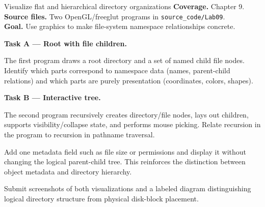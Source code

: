 \begin{labproject}{Visualize flat and hierarchical directory organizations}
\textbf{Coverage.} Chapter 9.\\
\textbf{Source files.} Two OpenGL/freeglut programs in \texttt{source\_code/Lab09}.\\
\textbf{Goal.} Use graphics to make file-system namespace relationships concrete.

\medskip\noindent\textbf{Task A --- Root with file children.}\par
The first program draws a root directory and a set of named child file nodes. Identify which parts correspond to namespace data (names, parent-child relations) and which parts are purely presentation (coordinates, colors, shapes).

\medskip\noindent\textbf{Task B --- Interactive tree.}\par
The second program recursively creates directory/file nodes, lays out children, supports visibility/collapse state, and performs mouse picking. Relate recursion in the program to recursion in pathname traversal.

\begin{tryit}
Add one metadata field such as file size or permissions and display it without changing the logical parent-child tree. This reinforces the distinction between object metadata and directory hierarchy.
\end{tryit}
\end{labproject}

\begin{labdeliverable}
Submit screenshots of both visualizations and a labeled diagram distinguishing logical directory structure from physical disk-block placement.
\end{labdeliverable}
